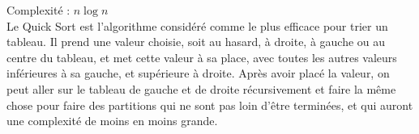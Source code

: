\label{quickSort}
\footnotesize 
\noindent
Complexité :  $ n\log n$
\\
\normalsize
Le Quick Sort est l'algorithme considéré comme le plus efficace pour trier un tableau. Il prend une valeur choisie, soit au hasard, à droite, à gauche ou au centre du tableau, et met cette valeur à sa place, avec toutes les autres valeurs inférieures à sa gauche, et supérieure à droite. Après avoir placé la valeur, on peut aller sur le tableau de gauche et de droite récursivement et faire la même chose pour faire des partitions qui ne sont pas loin d'être terminées, et qui auront une complexité de moins en moins grande.